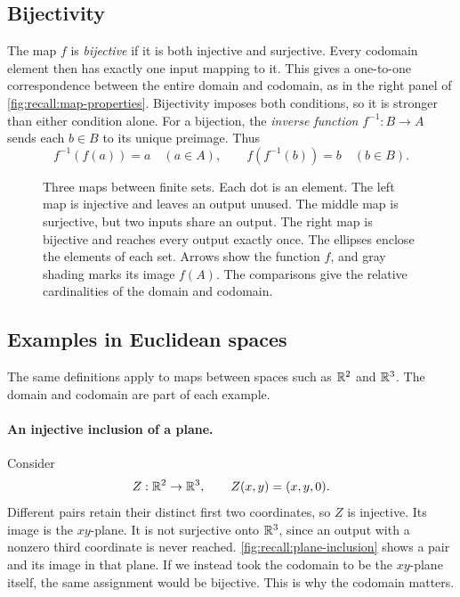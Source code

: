 \subsection{Bijectivity}

The map \(f\) is \emph{bijective} if it is both injective and surjective.
Every codomain element then has exactly one input mapping to it.
This gives a one-to-one correspondence between the entire domain
and codomain, as in the right panel of
\autoref{fig:recall:map-properties}. Bijectivity imposes both
conditions, so it is stronger than either condition alone.
For a bijection, the \emph{inverse function} \(f^{-1}:B\to A\) sends
each \(b\in B\) to its unique preimage. Thus
\[
  f^{-1}(f(a))=a\quad(a\in A),\qquad
  f(f^{-1}(b))=b\quad(b\in B).
\]

\begin{figure}[htbp]
  \centering
  
  \caption[Injective, surjective, and bijective maps.]{Three maps between
    finite sets. Each dot is an element. The left map is injective and leaves
    an output unused. The middle map is surjective, but two inputs share an
    output. The right map is bijective and reaches every output exactly
    once. The ellipses enclose the elements of each set.
    Arrows show the function \(f\), and gray shading
    marks its image \(f(A)\). The comparisons give the relative
    cardinalities of the domain and codomain.}
  \label{fig:recall:map-properties}
\end{figure}

\subsection{Examples in Euclidean spaces}

The same definitions apply to maps between spaces such as \(\mathbb{R}^2\)
and \(\mathbb{R}^3\). The domain and codomain are part of each example.

\paragraph{An injective inclusion of a plane.}
Consider
\[
  Z:\mathbb{R}^2\to\mathbb{R}^3,\qquad Z(x,y)=(x,y,0).
\]
Different pairs retain their distinct first two coordinates, so \(Z\)
is injective. Its image is the \(xy\)-plane. It is not surjective onto
\(\mathbb{R}^3\), since an output with a nonzero third coordinate is never reached.
\autoref{fig:recall:plane-inclusion} shows a pair and its image in that
plane.
If we instead took the codomain to be the \(xy\)-plane itself, the same
assignment would be bijective. This is why the codomain matters.

